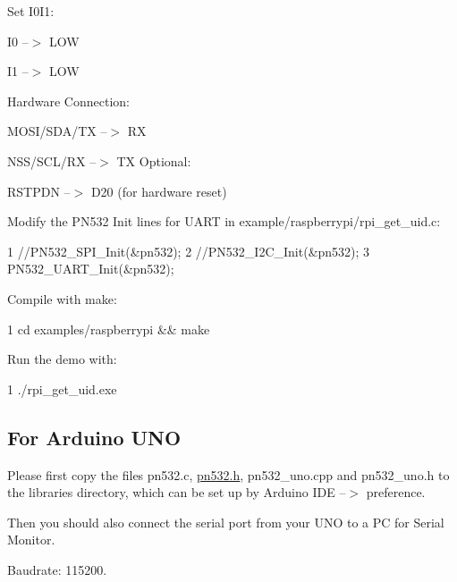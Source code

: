 \begin{DoxyEnumerate}
\item Set I0\+I1\+:
\end{DoxyEnumerate}
\begin{DoxyItemize}
\item I0 --$>$ L\+O\+W
\item I1 --$>$ L\+O\+W
\end{DoxyItemize}
\begin{DoxyEnumerate}
\item Hardware Connection\+:
\end{DoxyEnumerate}
\begin{DoxyItemize}
\item M\+O\+S\+I/\+S\+D\+A/\+T\+X --$>$ R\+X
\item N\+S\+S/\+S\+C\+L/\+R\+X --$>$ T\+X Optional\+:
\item R\+S\+T\+P\+D\+N --$>$ D20 (for hardware reset)
\end{DoxyItemize}
\begin{DoxyEnumerate}
\item Modify the P\+N532 Init lines for U\+A\+R\+T in {\ttfamily example/raspberrypi/rpi\+\_\+get\+\_\+uid.\+c}\+: 
\begin{DoxyCode}
1 //PN532\_SPI\_Init(&pn532);
2 //PN532\_I2C\_Init(&pn532);
3 PN532\_UART\_Init(&pn532);
\end{DoxyCode}

\item Compile with make\+: 
\begin{DoxyCode}
1 cd examples/raspberrypi && make
\end{DoxyCode}

\item Run the demo with\+: 
\begin{DoxyCode}
1 ./rpi\_get\_uid.exe
\end{DoxyCode}

\end{DoxyEnumerate}

\subsection*{For Arduino U\+N\+O}

Please first copy the files pn532.\+c, \hyperlink{pn532_8h}{pn532.\+h}, pn532\+\_\+uno.\+cpp and pn532\+\_\+uno.\+h to the libraries directory, which can be set up by Arduino I\+D\+E --$>$ preference.

Then you should also connect the serial port from your U\+N\+O to a P\+C for Serial Monitor.
\begin{DoxyItemize}
\item Baudrate\+: 115200.
\end{DoxyItemize}

